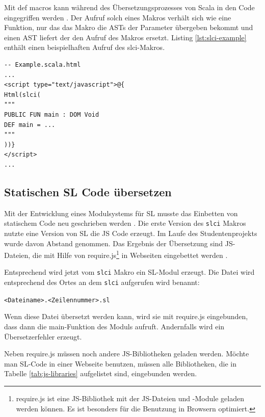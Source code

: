 \documentclass[12pt,bibtotoc]{scrreprt}
\begin{document}
Mit def macros kann während des Übersetzungsprozesses von Scala in den Code eingegriffen werden \cite{EPFL2}. Der Aufruf solch eines Makros verhält sich wie eine Funktion, nur das das Makro die \ac{AST}s der Parameter übergeben bekommt und einen \ac{AST} liefert der den Aufruf des Makros ersetzt. Listing \ref{lst:slci-example} enthält einen beispielhaften Aufruf des slci-Makros.

\begin{lstlisting}[caption={Beispielaufruf des slci-Makros in einer Play View}, label=lst:slci-example, float=h]
-- Example.scala.html
...
<script type="text/javascript">@{
Html(slci(
"""
PUBLIC FUN main : DOM Void
DEF main = ...
"""
))}
</script>
...
\end{lstlisting}

\subsection{Statischen SL Code übersetzen}
\label{subsec:compile-static-sl}

Mit der Entwicklung eines Modulsystems für \ac{SL} musste das Einbetten von statischem Code neu geschrieben werden \cite{Bisping2013}. Die erste Version des \lstinline!slci! Makros nutzte eine Version von \ac{SL} die \ac{JS} Code erzeugt. Im Laufe des Studentenprojekts wurde davon Abstand genommen. Das Ergebnis der Übersetzung sind \ac{JS}-Dateien, die mit Hilfe von require.js\footnote{require.js ist eine JS-Bibliothek mit der JS-Dateien und -Module geladen werden können. Es ist besonders für die Benutzung in Browsern optimiert.} in Webseiten eingebettet werden \cite{RequireJS1}.

Entsprechend wird jetzt vom \lstinline!slci! Makro ein \ac{SL}-Modul erzeugt. Die Datei wird entsprechend des Ortes an dem \lstinline!slci! aufgerufen wird benannt:
\begin{center}
\lstinline!<Dateiname>.<Zeilennummer>.sl!
\end{center}
Wenn diese Datei übersetzt werden kann, wird sie mit require.js eingebunden, dass dann die main-Funktion des Moduls aufruft. Andernfalls wird ein Übersetzerfehler erzeugt. 

Neben require.js müssen noch andere \ac{JS}-Bibliotheken geladen werden. Möchte man \ac{SL}-Code in einer Webseite benutzen, müssen alle Bibliotheken, die in Tabelle \ref{tab:js-libraries} aufgelistet sind, eingebunden werden.
\end{document}
